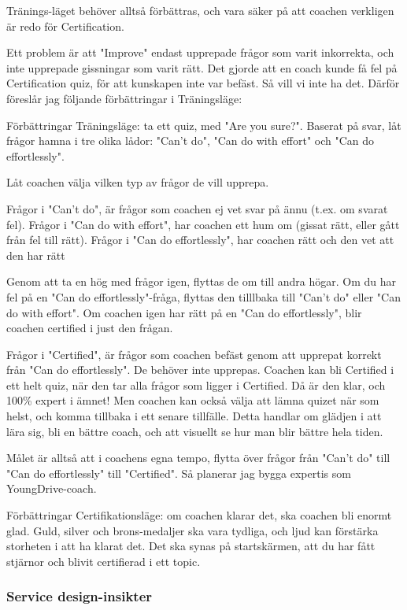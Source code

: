 Tränings-läget behöver alltså förbättras, och vara säker på att coachen verkligen är redo för Certification.

Ett problem är att "Improve" endast upprepade frågor som varit inkorrekta, och inte upprepade gissningar som varit rätt. Det gjorde att en coach kunde få fel på Certification quiz, för att kunskapen inte var befäst. Så vill vi inte ha det. Därför föreslår jag följande förbättringar i Träningsläge:

Förbättringar Träningsläge: ta ett quiz, med "Are you sure?". Baserat på svar, låt frågor hamna i tre olika lådor: "Can't do", "Can do with effort" och "Can do effortlessly".

Låt coachen välja vilken typ av frågor de vill upprepa.

Frågor i "Can't do", är frågor som coachen ej vet svar på ännu (t.ex. om svarat fel).
Frågor i "Can do with effort", har coachen ett hum om (gissat rätt, eller gått från fel till rätt).
Frågor i "Can do effortlessly", har coachen rätt och den vet att den har rätt

Genom att ta en hög med frågor igen, flyttas de om till andra högar. Om du har fel på en "Can do effortlessly"-fråga, flyttas den tilllbaka till "Can't do" eller "Can do with effort". Om coachen igen har rätt på en "Can do effortlessly", blir coachen certified i just den frågan.

Frågor i "Certified", är frågor som coachen befäst genom att upprepat korrekt från "Can do effortlessly". De behöver inte upprepas. Coachen kan bli Certified i ett helt quiz, när den tar alla frågor som ligger i Certified. Då är den klar, och 100\% expert i ämnet! Men coachen kan också välja att lämna quizet när som helst, och komma tillbaka i ett senare tillfälle. Detta handlar om glädjen i att lära sig, bli en bättre coach, och att visuellt se hur man blir bättre hela tiden.

Målet är alltså att i coachens egna tempo, flytta över frågor från "Can't do" till "Can do effortlessly" till "Certified". Så planerar jag bygga expertis som YoungDrive-coach.

Förbättringar Certifikationsläge: om coachen klarar det, ska coachen bli enormt glad. Guld, silver och brons-medaljer ska vara tydliga, och ljud kan förstärka storheten i att ha klarat det. Det ska synas på startskärmen, att du har fått stjärnor och blivit certifierad i ett topic.

\subsubsection{Service design-insikter}

